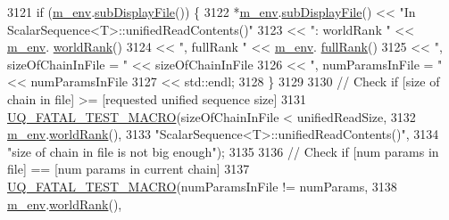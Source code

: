 \begin{DoxyCode}
3121               \textcolor{keywordflow}{if} (\hyperlink{class_q_u_e_s_o_1_1_scalar_sequence_a71618cd6351b29361b437af68447a4c8}{m\_env}.\hyperlink{class_q_u_e_s_o_1_1_base_environment_a8a0064746ae8dddfece4229b9ad374d6}{subDisplayFile}()) \{
3122                 *\hyperlink{class_q_u_e_s_o_1_1_scalar_sequence_a71618cd6351b29361b437af68447a4c8}{m\_env}.\hyperlink{class_q_u_e_s_o_1_1_base_environment_a8a0064746ae8dddfece4229b9ad374d6}{subDisplayFile}() << \textcolor{stringliteral}{"In ScalarSequence<T>::unifiedReadContents()"}
3123                                         << \textcolor{stringliteral}{": worldRank "}           << \hyperlink{class_q_u_e_s_o_1_1_scalar_sequence_a71618cd6351b29361b437af68447a4c8}{m\_env}.
      \hyperlink{class_q_u_e_s_o_1_1_base_environment_a78b57112bbd0e6dd0e8afec00b40ffa7}{worldRank}()
3124                                         << \textcolor{stringliteral}{", fullRank "}            << \hyperlink{class_q_u_e_s_o_1_1_scalar_sequence_a71618cd6351b29361b437af68447a4c8}{m\_env}.
      \hyperlink{class_q_u_e_s_o_1_1_base_environment_a84a239e42ae443cf71db6e03e8159620}{fullRank}()
3125                                         << \textcolor{stringliteral}{", sizeOfChainInFile = "} << sizeOfChainInFile
3126                                         << \textcolor{stringliteral}{", numParamsInFile = "}   << numParamsInFile
3127                                         << std::endl;
3128               \}
3129 
3130               \textcolor{comment}{// Check if [size of chain in file] >= [requested unified sequence size]}
3131               \hyperlink{_defines_8h_a56d63d18d0a6d45757de47fcc06f574d}{UQ\_FATAL\_TEST\_MACRO}(sizeOfChainInFile < unifiedReadSize,
3132                                   \hyperlink{class_q_u_e_s_o_1_1_scalar_sequence_a71618cd6351b29361b437af68447a4c8}{m\_env}.\hyperlink{class_q_u_e_s_o_1_1_base_environment_a78b57112bbd0e6dd0e8afec00b40ffa7}{worldRank}(),
3133                                   \textcolor{stringliteral}{"ScalarSequence<T>::unifiedReadContents()"},
3134                                   \textcolor{stringliteral}{"size of chain in file is not big enough"});
3135 
3136               \textcolor{comment}{// Check if [num params in file] == [num params in current chain]}
3137               \hyperlink{_defines_8h_a56d63d18d0a6d45757de47fcc06f574d}{UQ\_FATAL\_TEST\_MACRO}(numParamsInFile != numParams,
3138                                   \hyperlink{class_q_u_e_s_o_1_1_scalar_sequence_a71618cd6351b29361b437af68447a4c8}{m\_env}.\hyperlink{class_q_u_e_s_o_1_1_base_environment_a78b57112bbd0e6dd0e8afec00b40ffa7}{worldRank}(),

\end{DoxyCode}
